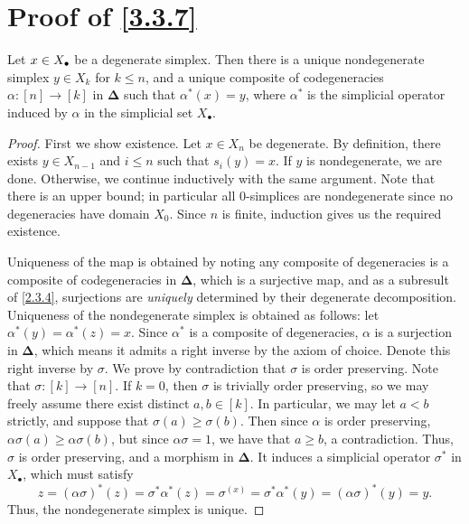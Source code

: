 \section{Proof of \cref{3.3.7}}\label{secB}

\begin{lemma}\label{B.1.1}
	Let $x\in X_\bullet$ be a degenerate simplex. Then there is a unique nondegenerate simplex $y\in X_{k}  $ for $k\leq n$, and a unique composite of codegeneracies $\alpha : [n] \to [k]$ in $\boldsymbol{\Delta} $ such that $\alpha^*(x)=y$, where $\alpha^*$ is the simplicial operator induced by $\alpha$ in the simplicial set $X_{\bullet} $.
\end{lemma}
\begin{proof}
	First we show existence. Let $x\in X_n$ be degenerate. By definition, there exists $y\in X_{n-1} $ and $i\leq n$ such that $s_i(y)=x$. If $y$ is nondegenerate, we are done. Otherwise, we continue inductively with the same argument. Note that there is an upper bound; in particular all $0$-simplices are nondegenerate since no degeneracies have domain $X_0$. Since $n$ is finite, induction gives us the required existence.

	Uniqueness of the map is obtained by noting any composite of degeneracies is a composite of codegeneracies in $\boldsymbol{\Delta} $, which is a surjective map, and as a subresult of \cref{2.3.4}, surjections are \emph{uniquely} determined by their degenerate decomposition. Uniqueness of the nondegenerate simplex is obtained as follows: let $\alpha^*(y)=\alpha^*(z)=x$. Since $\alpha^*$ is a composite of degeneracies, $\alpha$ is a surjection in $\boldsymbol{\Delta} $, which means it admits a right inverse by the axiom of choice. Denote this right inverse by $\sigma$. We prove by contradiction that $\sigma$ is order preserving. Note that $\sigma : [k]\to [n]$. If $k=0$, then $\sigma$ is trivially order preserving, so we may freely assume there exist distinct $a,b\in[k]$. In particular, we may let $a< b$ strictly, and suppose that $\sigma(a)\geq \sigma(b)$. Then since $\alpha$ is order preserving, $\alpha\sigma(a)\geq \alpha\sigma(b)$, but since $\alpha\sigma=1$, we have that $a\geq b$, a contradiction. Thus, $\sigma$ is order preserving, and a morphism in $\boldsymbol{\Delta} $. It induces a simplicial operator $\sigma^*$ in $X_{\bullet} $, which must satisfy
	\[
		z=(\alpha\sigma)^*(z)=\sigma^*\alpha^*(z)=\sigma^(x)=\sigma^*\alpha^*(y)=(\alpha\sigma)^*(y)=y
	.\]
	Thus, the nondegenerate simplex is unique.
\end{proof}

